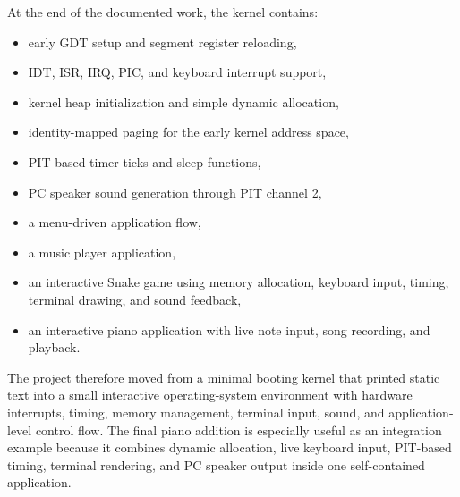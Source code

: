 At the end of the documented work, the kernel contains:
\begin{itemize}
  \item early GDT setup and segment register reloading,
  \item IDT, ISR, IRQ, PIC, and keyboard interrupt support,
  \item kernel heap initialization and simple dynamic allocation,
  \item identity-mapped paging for the early kernel address space,
  \item PIT-based timer ticks and sleep functions,
  \item PC speaker sound generation through PIT channel 2,
  \item a menu-driven application flow,
  \item a music player application,
  \item an interactive Snake game using memory allocation, keyboard input, timing, terminal drawing, and sound feedback,
  \item an interactive piano application with live note input, song recording, and playback.
\end{itemize}

The project therefore moved from a minimal booting kernel that printed static text into a small interactive operating-system environment with hardware interrupts, timing, memory management, terminal input, sound, and application-level control flow. The final piano addition is especially useful as an integration example because it combines dynamic allocation, live keyboard input, PIT-based timing, terminal rendering, and PC speaker output inside one self-contained application.
